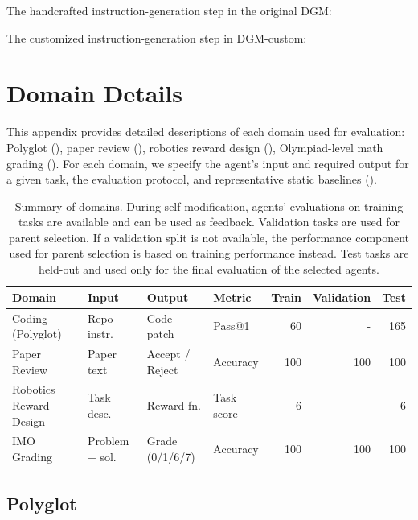 \documentclass[]{fairmeta}
\begin{document}
The handcrafted instruction-generation step in the original DGM:


The customized instruction-generation step in DGM-custom:


\section{Domain Details}
\label{app:domain-details}

This appendix provides detailed descriptions of each domain used for evaluation: Polyglot (), paper review (), robotics reward design (), Olympiad-level math grading (). For each domain, we specify the agent's input and required output for a given task, the evaluation protocol, and representative static baselines ().

\begin{table}[H]
\centering
\small
\setlength{\tabcolsep}{4pt}
\begin{tabular}{l l l l r r r}
\toprule
\textbf{Domain} & \textbf{Input} & \textbf{Output} & \textbf{Metric} & \textbf{Train} & \textbf{Validation} & \textbf{Test} \\
\midrule
Coding (Polyglot) & Repo + instr. & Code patch & Pass@1 & 60 & - & 165 \\
Paper Review & Paper text & Accept / Reject & Accuracy & 100 & 100 & 100 \\
Robotics Reward Design & Task desc. & Reward fn. & Task score & 6 & - & 6 \\
IMO Grading & Problem + sol. & Grade (0/1/6/7) & Accuracy & 100 & 100 & 100 \\
\bottomrule
\end{tabular}
\caption{Summary of domains. During self-modification, agents' evaluations on training tasks are available and can be used as feedback. Validation tasks are used for parent selection. If a validation split is not available, the performance component used for parent selection is based on training performance instead. Test tasks are held-out and used only for the final evaluation of the selected agents.}
\label{tab:domain-summary}
\end{table}

\subsection{Polyglot}
\label{app:domain-polyglot}
\end{document}
